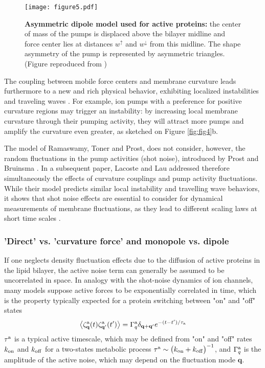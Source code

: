 \documentclass[graybox]{svmult}
\begin{document}
\begin{figure}
	\centering
		\texttt{[image: figure5.pdf]}
	\caption{\textbf{Asymmetric dipole model used for active proteins:} the center of mass of the pumps is displaced above the bilayer midline and force center lies at distances $w^{\uparrow}$ and $w^{\downarrow}$ from this midline. The shape asymmetry of the pump is represented by asymmetric triangles. (Figure reproduced from \cite{Sankararaman:2002})}
	\label{fig:fig5}
\end{figure}
	
The coupling between mobile force centers and membrane curvature leads furthermore to a new and rich physical behavior, exhibiting localized instabilities and traveling waves \cite{Ramaswamy:2000}. For example, ion pumps with a preference for positive curvature regions may trigger an instability: by increasing local membrane curvature through their pumping activity, they will attract more pumps and amplify the curvature even greater, as sketched on Figure \ref{fig:fig4}b. 

The model of Ramaswamy, Toner and Prost, does not consider, however, the random fluctuations in the pump activities (shot noise), introduced by Prost and Bruinsma \cite{Prost:1996}. In a subsequent paper, Lacoste and Lau addressed therefore simultaneously the effects of curvature couplings and pump activity fluctuations. While their model predicts similar local instability and travelling wave behaviors, it shows that shot noise effects are essential to consider for dynamical measurements of membrane fluctuations, as they lead to different scaling laws at short time scales \cite{Lacoste:2005}.

		\subsubsection{'Direct' vs. 'curvature force' and monopole vs. dipole}
If one neglects density fluctuation effects due to the diffusion of active proteins in the lipid bilayer, the active noise term can generally be assumed to be uncorrelated in space. In analogy with the shot-noise dynamics of ion channels, many models suppose active forces to be exponentially correlated in time, which is the property typically expected for a protein switching between "on" and "off" states \cite{Gardiner:1985}
\begin{equation}
\left\langle \zeta_{\mathbf{q}}^{\rm{a}}(t)\zeta_{\mathbf{q}'}^{\rm{a}}(t') \right\rangle = \Gamma^{\rm{a}}_{q}\delta_{\mathbf{q}+\mathbf{q}'}e^{-(t-t')/\tau_{\rm{a}}}
\label{eq:ActiveNoiseCorrelation}
\end{equation}
$\tau^{\rm{a}}$ is a typical active timescale, which may be defined from "on" and "off" rates $k_{\rm{on}}$ and $k_{\rm{off}}$ for a two-states metabolic process $\tau^{\rm{a}} \sim \big( k_{\rm{on}} + k_{\rm{off}}\big)^{-1}$, and $\Gamma^{\rm{a}}_q$ is the amplitude of the active noise, which may depend on the fluctuation mode $\mathbf{q}$.
\end{document}
